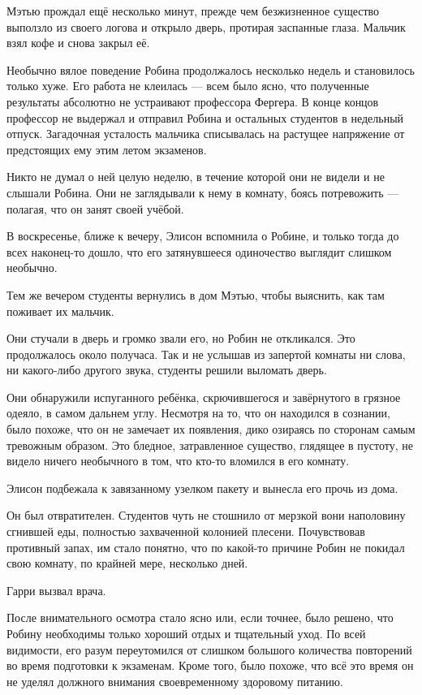 \documentclass[a5paper, 9pt,
final, openany, twoside=true]{memoir}
\begin{document}
Мэтью прождал ещё несколько минут, прежде чем безжизненное существо выползло из своего логова и открыло дверь, протирая заспанные глаза. Мальчик взял кофе и снова закрыл её.\bigskip

Необычно вялое поведение Робина продолжалось несколько недель и становилось только хуже. Его работа не клеилась — всем было ясно, что полученные результаты абсолютно не устраивают профессора Фергера. В конце концов профессор не выдержал и отправил Робина и остальных студентов в недельный отпуск. Загадочная усталость мальчика списывалась на растущее напряжение от предстоящих ему этим летом экзаменов.

Никто не думал о ней целую неделю, в течение которой они не видели и не слышали Робина. Они не заглядывали к нему в комнату, боясь потревожить — полагая, что он занят своей учёбой.

В воскресенье, ближе к вечеру, Элисон вспомнила о Робине, и только тогда до всех наконец-то дошло, что его затянувшееся одиночество выглядит слишком необычно.

Тем же вечером студенты вернулись в дом Мэтью, чтобы выяснить, как там поживает их мальчик.

Они стучали в дверь и громко звали его, но Робин не откликался. Это продолжалось около получаса. Так и не услышав из запертой комнаты ни слова, ни какого-либо другого звука, студенты решили выломать дверь.

Они обнаружили испуганного ребёнка, скрючившегося и завёрнутого в грязное одеяло, в самом дальнем углу. Несмотря на то, что он находился в сознании, было похоже, что он не замечает их появления, дико озираясь по сторонам самым тревожным образом. Это бледное, затравленное существо, глядящее в пустоту, не видело ничего необычного в том, что кто-то вломился в его комнату.

Элисон подбежала к завязанному узелком пакету и вынесла его прочь из дома.

Он был отвратителен. Студентов чуть не стошнило от мерзкой вони наполовину сгнившей еды, полностью захваченной колонией плесени. Почувствовав противный запах, им стало понятно, что по какой-то причине Робин не покидал свою комнату, по крайней мере, несколько дней.

Гарри вызвал врача.\bigskip

После внимательного осмотра стало ясно или, если точнее, было решено, что Робину необходимы только хороший отдых и тщательный уход. По всей видимости, его разум переутомился от слишком большого количества повторений во время подготовки к экзаменам. Кроме того, было похоже, что всё это время он не уделял должного внимания своевременному здоровому питанию.\bigskip
\end{document}
